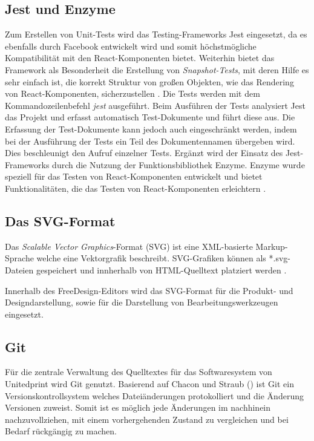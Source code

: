 \subsection{Jest und Enzyme}
Zum Erstellen von Unit-Tests wird das Testing-Frameworks Jest eingesetzt, da es ebenfalls durch Facebook entwickelt wird und somit höchstmögliche Kompatibilität mit den React-Komponenten bietet. Weiterhin bietet das Framework als Besonderheit die Erstellung von \emph{Snapshot-Tests}, mit deren Hilfe es sehr einfach ist, die korrekt Struktur von großen Objekten, wie das Rendering von React-Komponenten, sicherzustellen \autocite[vgl.][]{Facebook:JestIntroduction}.
Die Tests werden mit dem Kommandozeilenbefehl \emph{jest} ausgeführt.
Beim Ausführen der Tests analysiert Jest das Projekt und erfasst automatisch Test-Dokumente und führt diese aus. 
Die Erfassung der Test-Dokumente kann jedoch auch eingeschränkt werden, indem bei der Ausführung der Tests ein Teil des Dokumentennamen übergeben wird. Dies beschleunigt den Aufruf einzelner Tests. 
Ergänzt wird der Einsatz des Jest-Frameworks durch die Nutzung der Funktionsbibliothek Enzyme. Enzyme wurde speziell für das Testen von React-Komponenten entwickelt und bietet Funktionalitäten, die das Testen von React-Komponenten erleichtern \autocite[vgl.][]{Enzyme:Introduction}.

\subsection{Das SVG-Format}
Das \emph{Scalable Vector Graphics}-Format (SVG) ist eine XML-basierte Markup-Sprache welche eine Vektorgrafik beschreibt. SVG-Grafiken können als *.svg-Dateien gespeichert und innherhalb von HTML-Quelltext platziert werden \autocite[vgl.][]{W3C:AboutSVG}. 

Innerhalb des FreeDesign-Editors wird das SVG-Format für die Produkt- und Designdarstellung, sowie für die Darstellung von Bearbeitungswerkzeugen eingesetzt. 

\subsection{Git}
\label{chap:git}
Für die zentrale Verwaltung des Quelltextes für das Softwaresystem von Unitedprint wird Git genutzt. 
Basierend auf Chacon und Straub (\citeyear{Git:About}) ist Git ein Versionskontrollsystem welches Dateiänderungen protokolliert und die Änderung Versionen zuweist. Somit ist es möglich jede Änderungen im nachhinein nachzuvollziehen, mit einem vorhergehenden Zustand zu vergleichen und bei Bedarf rückgängig zu machen.

